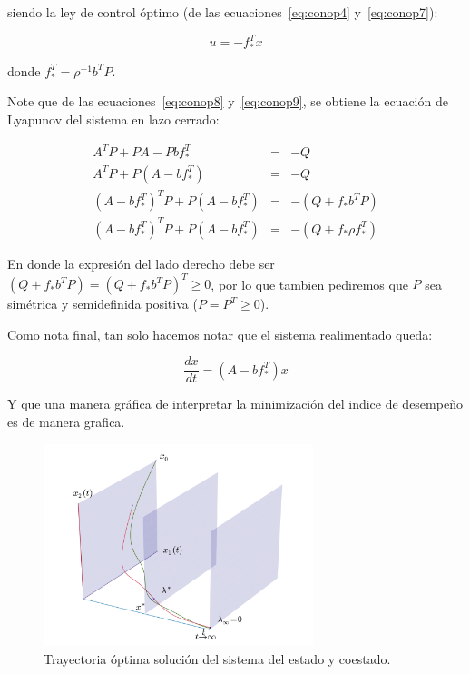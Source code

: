     siendo la ley de control óptimo (de las ecuaciones~\ref{eq:conop4} y~\ref{eq:conop7}):

    \begin{equation} \label{eq:conop9}
        u = -f_*^T x
    \end{equation}

    donde $f_*^T = \rho^{-1} b^T P$.

    Note que de las ecuaciones~\ref{eq:conop8} y~\ref{eq:conop9}, se obtiene la ecuación de Lyapunov del sistema en lazo cerrado:

    \begin{eqnarray}
        A^T P + P A - P b f_*^T & = & -Q \nonumber \\
        A^T P + P \left( A - b f_*^T \right) & = & - Q \nonumber \\
        \left( A - b f_*^T \right)^T P + P \left( A - b f_*^T \right) & = & - \left( Q + f_* b^T P \right) \nonumber \\
        \left( A - b f_*^T \right)^T P + P \left( A - b f_*^T \right) & = & - \left( Q + f_* \rho f_*^T \right)
    \end{eqnarray}

    En donde la expresión del lado derecho debe ser $\left( Q + f_* b^T P \right) = \left( Q + f_* b^T P \right)^T \ge 0$, por lo que tambien pediremos que $P$ sea simétrica y semidefinida positiva ($P = P^T \ge 0$).

    Como nota final, tan solo hacemos notar que el sistema realimentado queda:

    \begin{equation}
        \frac{dx}{dt} = (A - b f_*^T) x
    \end{equation}

    Y que una manera gráfica de interpretar la minimización del indice de desempeño es de manera grafica.

    \begin{figure}
        \centering
        \includegraphics[width=0.7\textwidth]{./imagenes/trayectorias3d.pdf}
        \caption{\label{fig:trayectoriaoptima}Trayectoria óptima solución del sistema del estado y coestado.}
    \end{figure}

